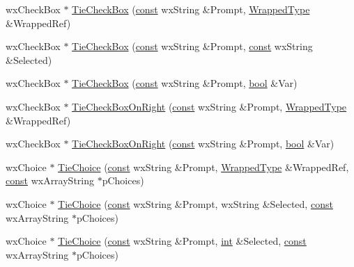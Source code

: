 \begin{DoxyCompactItemize}
wx\+Check\+Box $\ast$ \hyperlink{class_shuttle_gui_base_a6936617e42a318feca1856916f2f5a6f}{Tie\+Check\+Box} (\hyperlink{getopt1_8c_a2c212835823e3c54a8ab6d95c652660e}{const} wx\+String \&Prompt, \hyperlink{class_wrapped_type}{Wrapped\+Type} \&Wrapped\+Ref)
\item 
wx\+Check\+Box $\ast$ \hyperlink{class_shuttle_gui_base_a66c42d9ceb3d3ad50824f17a3af2caaf}{Tie\+Check\+Box} (\hyperlink{getopt1_8c_a2c212835823e3c54a8ab6d95c652660e}{const} wx\+String \&Prompt, \hyperlink{getopt1_8c_a2c212835823e3c54a8ab6d95c652660e}{const} wx\+String \&Selected)
\item 
wx\+Check\+Box $\ast$ \hyperlink{class_shuttle_gui_base_a8a5cd85323141a80342b8b11d07493f4}{Tie\+Check\+Box} (\hyperlink{getopt1_8c_a2c212835823e3c54a8ab6d95c652660e}{const} wx\+String \&Prompt, \hyperlink{mac_2config_2i386_2lib-src_2libsoxr_2soxr-config_8h_abb452686968e48b67397da5f97445f5b}{bool} \&Var)
\item 
wx\+Check\+Box $\ast$ \hyperlink{class_shuttle_gui_base_a03ab178fe38e6a029a35cf1f0f56489d}{Tie\+Check\+Box\+On\+Right} (\hyperlink{getopt1_8c_a2c212835823e3c54a8ab6d95c652660e}{const} wx\+String \&Prompt, \hyperlink{class_wrapped_type}{Wrapped\+Type} \&Wrapped\+Ref)
\item 
wx\+Check\+Box $\ast$ \hyperlink{class_shuttle_gui_base_a0d96844a33ba2fffc8dc4173e47ba787}{Tie\+Check\+Box\+On\+Right} (\hyperlink{getopt1_8c_a2c212835823e3c54a8ab6d95c652660e}{const} wx\+String \&Prompt, \hyperlink{mac_2config_2i386_2lib-src_2libsoxr_2soxr-config_8h_abb452686968e48b67397da5f97445f5b}{bool} \&Var)
\item 
wx\+Choice $\ast$ \hyperlink{class_shuttle_gui_base_a2613dd7b8430a479e4ea8b0bb53736c6}{Tie\+Choice} (\hyperlink{getopt1_8c_a2c212835823e3c54a8ab6d95c652660e}{const} wx\+String \&Prompt, \hyperlink{class_wrapped_type}{Wrapped\+Type} \&Wrapped\+Ref, \hyperlink{getopt1_8c_a2c212835823e3c54a8ab6d95c652660e}{const} wx\+Array\+String $\ast$p\+Choices)
\item 
wx\+Choice $\ast$ \hyperlink{class_shuttle_gui_base_ab032fefbc2a493b6e9b4438d5fd68a34}{Tie\+Choice} (\hyperlink{getopt1_8c_a2c212835823e3c54a8ab6d95c652660e}{const} wx\+String \&Prompt, wx\+String \&Selected, \hyperlink{getopt1_8c_a2c212835823e3c54a8ab6d95c652660e}{const} wx\+Array\+String $\ast$p\+Choices)
\item 
wx\+Choice $\ast$ \hyperlink{class_shuttle_gui_base_a3f78368a41fe27a402434ebb0addb837}{Tie\+Choice} (\hyperlink{getopt1_8c_a2c212835823e3c54a8ab6d95c652660e}{const} wx\+String \&Prompt, \hyperlink{xmltok_8h_a5a0d4a5641ce434f1d23533f2b2e6653}{int} \&Selected, \hyperlink{getopt1_8c_a2c212835823e3c54a8ab6d95c652660e}{const} wx\+Array\+String $\ast$p\+Choices)

\end{DoxyCompactItemize}
